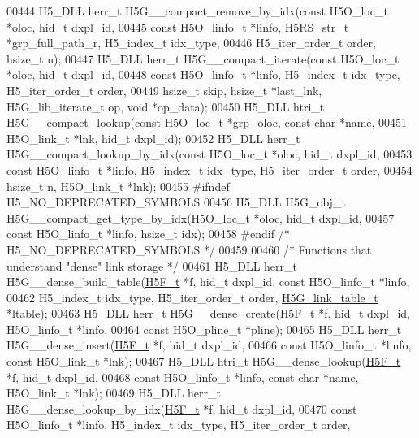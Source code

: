 \begin{DoxyCode}
00444 H5\_DLL herr\_t H5G\_\_compact\_remove\_by\_idx(\textcolor{keyword}{const} H5O\_loc\_t *oloc, hid\_t dxpl\_id,
00445     \textcolor{keyword}{const} H5O\_linfo\_t *linfo, H5RS\_str\_t *grp\_full\_path\_r, H5\_index\_t idx\_type,
00446     H5\_iter\_order\_t order, hsize\_t n);
00447 H5\_DLL herr\_t H5G\_\_compact\_iterate(\textcolor{keyword}{const} H5O\_loc\_t *oloc, hid\_t dxpl\_id,
00448     \textcolor{keyword}{const} H5O\_linfo\_t *linfo, H5\_index\_t idx\_type, H5\_iter\_order\_t order,
00449     hsize\_t skip, hsize\_t *last\_lnk, H5G\_lib\_iterate\_t op, \textcolor{keywordtype}{void} *op\_data);
00450 H5\_DLL htri\_t H5G\_\_compact\_lookup(\textcolor{keyword}{const} H5O\_loc\_t *grp\_oloc, \textcolor{keyword}{const} \textcolor{keywordtype}{char} *name,
00451     H5O\_link\_t *lnk, hid\_t dxpl\_id);
00452 H5\_DLL herr\_t H5G\_\_compact\_lookup\_by\_idx(\textcolor{keyword}{const} H5O\_loc\_t *oloc, hid\_t dxpl\_id,
00453     \textcolor{keyword}{const} H5O\_linfo\_t *linfo, H5\_index\_t idx\_type, H5\_iter\_order\_t order,
00454     hsize\_t n, H5O\_link\_t *lnk);
00455 \textcolor{preprocessor}{#ifndef H5\_NO\_DEPRECATED\_SYMBOLS}
00456 H5\_DLL H5G\_obj\_t H5G\_\_compact\_get\_type\_by\_idx(H5O\_loc\_t *oloc, hid\_t dxpl\_id,
00457     \textcolor{keyword}{const} H5O\_linfo\_t *linfo, hsize\_t idx);
00458 \textcolor{preprocessor}{#endif }\textcolor{comment}{/* H5\_NO\_DEPRECATED\_SYMBOLS */}\textcolor{preprocessor}{}
00459 
00460 \textcolor{comment}{/* Functions that understand "dense" link storage */}
00461 H5\_DLL herr\_t H5G\_\_dense\_build\_table(\hyperlink{struct_h5_f__t}{H5F\_t} *f, hid\_t dxpl\_id, \textcolor{keyword}{const} H5O\_linfo\_t *linfo,
00462     H5\_index\_t idx\_type, H5\_iter\_order\_t order, \hyperlink{struct_h5_g__link__table__t}{H5G\_link\_table\_t} *ltable);
00463 H5\_DLL herr\_t H5G\_\_dense\_create(\hyperlink{struct_h5_f__t}{H5F\_t} *f, hid\_t dxpl\_id, H5O\_linfo\_t *linfo,
00464     \textcolor{keyword}{const} H5O\_pline\_t *pline);
00465 H5\_DLL herr\_t H5G\_\_dense\_insert(\hyperlink{struct_h5_f__t}{H5F\_t} *f, hid\_t dxpl\_id,
00466     \textcolor{keyword}{const} H5O\_linfo\_t *linfo, \textcolor{keyword}{const} H5O\_link\_t *lnk);
00467 H5\_DLL htri\_t H5G\_\_dense\_lookup(\hyperlink{struct_h5_f__t}{H5F\_t} *f, hid\_t dxpl\_id,
00468     \textcolor{keyword}{const} H5O\_linfo\_t *linfo, \textcolor{keyword}{const} \textcolor{keywordtype}{char} *name, H5O\_link\_t *lnk);
00469 H5\_DLL herr\_t H5G\_\_dense\_lookup\_by\_idx(\hyperlink{struct_h5_f__t}{H5F\_t} *f, hid\_t dxpl\_id,
00470     \textcolor{keyword}{const} H5O\_linfo\_t *linfo, H5\_index\_t idx\_type, H5\_iter\_order\_t order,

\end{DoxyCode}
